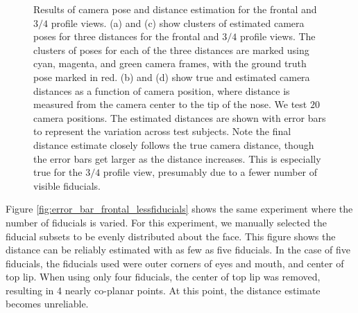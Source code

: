 \documentclass[runningheads]{llncs}
\begin{document}
\begin{figure}[ht!]
\begin{tabular}{cc}
\end{tabular}
\caption{	
Results of camera pose and distance estimation for the frontal and $3/4$ profile views.
(a) and (c) show clusters of estimated camera poses for three distances for the frontal and $3/4$ profile views.
The clusters of poses for each of the three distances are marked using cyan, magenta, and green camera frames, with the ground truth pose marked in red.
(b) and (d) show true and estimated camera distances as a function of camera position, where distance is measured from the camera center to the tip of the nose.
We test $20$ camera positions.
The estimated distances are shown with error bars to represent the variation across test subjects.
Note the final distance estimate closely follows the true camera distance, though the error bars get larger as the distance increases.  
This is especially true for the $3/4$ profile view, presumably due to a fewer number of visible fiducials.   
}
\label{fig:results}
\end{figure}

Figure \ref{fig:error_bar_frontal_lessfiducials} shows the same experiment where the number of fiducials is varied.  
For this experiment, we manually selected the fiducial subsets to be evenly distributed about the face.  
This figure shows the distance can be reliably estimated with as few as five fiducials.  
In the case of five fiducials, the fiducials used were outer corners of eyes and mouth, and center of top lip.
When using only four fiducials, the center of top lip was removed, resulting in 4 nearly co-planar points.
At this point, the distance estimate becomes unreliable.
\end{document}
